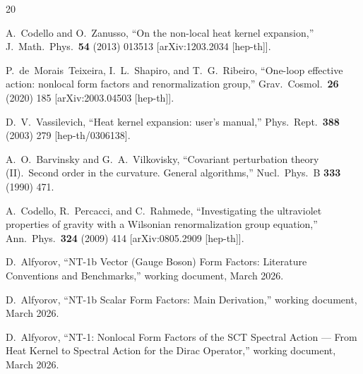\documentclass[11pt,a4paper]{article}
\theoremstyle{definition}
\theoremstyle{remark}
\begin{document}
\begin{thebibliography}{20}

A.~Codello and O.~Zanusso,
``On the non-local heat kernel expansion,''
J.\ Math.\ Phys.\ \textbf{54} (2013) 013513
[arXiv:1203.2034 [hep-th]].

P.~de~Morais~Teixeira, I.~L.~Shapiro, and T.~G.~Ribeiro,
``One-loop effective action: nonlocal form factors and
renormalization group,''
Grav.\ Cosmol.\ \textbf{26} (2020) 185
[arXiv:2003.04503 [hep-th]].

D.~V.~Vassilevich,
``Heat kernel expansion: user's manual,''
Phys.\ Rept.\ \textbf{388} (2003) 279
[hep-th/0306138].

A.~O.~Barvinsky and G.~A.~Vilkovisky,
``Covariant perturbation theory (II).\ Second order in the curvature.
General algorithms,''
Nucl.\ Phys.\ B \textbf{333} (1990) 471.

A.~Codello, R.~Percacci, and C.~Rahmede,
``Investigating the ultraviolet properties of gravity with a
Wilsonian renormalization group equation,''
Ann.\ Phys.\ \textbf{324} (2009) 414
[arXiv:0805.2909 [hep-th]].

D.~Alfyorov,
``NT-1b Vector (Gauge Boson) Form Factors: Literature Conventions
and Benchmarks,''
working document, March 2026.

D.~Alfyorov,
``NT-1b Scalar Form Factors: Main Derivation,''
working document, March 2026.

D.~Alfyorov,
``NT-1: Nonlocal Form Factors of the SCT Spectral Action ---
From Heat Kernel to Spectral Action for the Dirac Operator,''
working document, March 2026.

\end{thebibliography}
\end{document}
